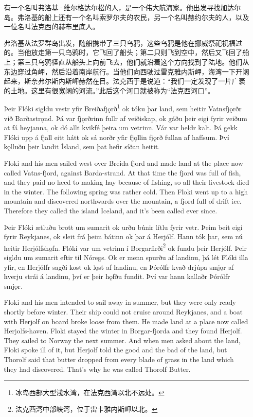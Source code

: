 \begin{translation*}{}
    有一个名叫弗洛基·维尔格达尔松的人，是一个伟大航海家。他出发寻找加达尔岛。弗洛基的船上还有一个名叫索罗尔夫的农民，另一个名叫赫约尔夫的人，以及一位名叫法克西的赫布里底人。

    弗洛基从法罗群岛出发，随船携带了三只乌鸦，这些乌鸦是他在挪威祭祀祝福过的。当他放走第一只乌鸦时，它飞回了船头；第二只则飞到空中，然后又飞回了船上；第三只乌鸦径直从船头上向前飞去，他们就沿着这个方向找到了陆地。他们从东边穿过角岬，然后沿着南岸航行。当他们向西驶过雷克雅内斯岬，海湾一下开阔起来，斯奈弗尔斯内斯岬赫然在目。法克西于是说道：“我们一定发现了一片广袤的土地。这里有很宽阔的河流。”此后这个河口就被称为“法克西河口”。
\end{translation*}


\begin{paracol}{2}
    Þeir Flóki sigldu vestr yfir Breiðafjǫrð\footnote{冰岛西部大型浅水湾，在法克西湾以北不远处。} ok tóku þar land, sem heitir Vatnsfjǫrðr við Barðastrǫnd. Þá var fjǫrðrinn fullr af veiðiskap, ok gáðu þeir eigi fyrir veiðum at fá heyjanna, ok dó allt kvikfé þeira um vetrinn. Vár var heldr kalt. Þá gekk Flóki upp á fjall eitt hátt ok sá norðr yfir fjǫllin fjǫrð fullan af hafísum. Því kǫlluðu þeir landit Ísland, sem þat hefir síðan heitit.
    \switchcolumn

    Floki and his men sailed west over Breida-fjord and made land at the place now called Vatns-fjord, against Barda-strand. At that time the fjord was full of fish, and they paid no heed to making hay because of fishing, so all their livestock died in the winter. The following spring was rather cold. Then Floki went up to a high mountain and discovered northwards over the mountain, a fjord full of drift ice. Therefore they called the island Iceland, and it's been called ever since.

    \switchcolumn*

    Þeir Flóki ætluðu brott um sumarit ok urðu búnir lítlu fyrir vetr. Þeim beit eigi fyrir Reykjanes, ok sleit frá þeim bátinn ok þar á Herjólf. Hann tók þar, sem nú heitir Herjólfshǫfn. Flóki var um vetrinn í Borgarfirði\footnote{法克西湾中部峡湾，位于雷卡雅内斯岬以北。} ok fundu þeir Herjólf. Þeir sigldu um sumarit eftir til Nóregs.
    Ok er menn spurðu af landinu, þá lét Flóki illa yfir, en Herjólfr sagði kost ok lǫst af landinu, en Þórólfr kvað drjúpa smjǫr af hverju strái á landinu, því er þeir hǫfðu fundit. Því var hann kallaðr Þórólfr smjǫr.

    \switchcolumn

    Floki and his men intended to sail away in summer, but they were only ready shortly before winter. Their ship could not cruise around Reykjanes, and a boat with Herjolf on board broke loose from them. He made land at a place now called Herjolfs-haven. Floki stayed the winter in Borgar-fjorda and they found Herjolf. They sailed to Norway the next summer. And when men asked about the land, Floki spoke ill of it, but Herjolf told the good and the bad of the land, but Thorolf said that butter dropped from every blade of grass in the land which they had discovered. That's why he was called Thorolf Butter.
\end{paracol}

